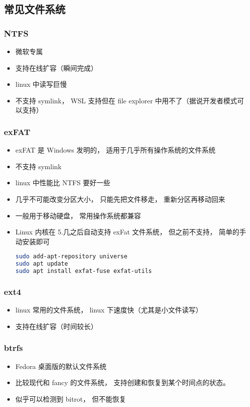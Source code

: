\subsection{常见文件系统}
\subsubsection{NTFS}
\begin{itemize}
\item 微软专属
\item 支持在线扩容（瞬间完成）
\item linux 中读写巨慢
\item 不支持 symlink， WSL 支持但在 file explorer 中用不了（据说开发者模式可以支持）
\end{itemize}

\subsubsection{exFAT}
\begin{itemize}
\item exFAT 是 Windows 发明的， 适用于几乎所有操作系统的文件系统
\item 不支持 symlink
\item linux 中性能比 NTFS 要好一些
\item 几乎不可能改变分区大小， 只能先把文件移走， 重新分区再移动回来
\item 一般用于移动硬盘， 常用操作系统都兼容
\item Linux 内核在 5.几之后自动支持 exFat 文件系统， 但之前不支持， 简单的手动安装即可
\begin{lstlisting}[language=bash]
sudo add-apt-repository universe
sudo apt update
sudo apt install exfat-fuse exfat-utils
\end{lstlisting}
\end{itemize}

\subsubsection{ext4}
\begin{itemize}
\item linux 常用的文件系统， linux 下速度快（尤其是小文件读写）
\item 支持在线扩容（时间较长）
\end{itemize}

\subsubsection{btrfs}
\begin{itemize}
\item Fedora 桌面版的默认文件系统
\item 比较现代和 fancy 的文件系统， 支持创建和恢复到某个时间点的状态。
\item 似乎可以检测到 bitrot， 但不能恢复
\end{itemize}
